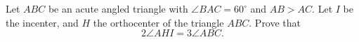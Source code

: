 Let $ABC$ be an acute angled triangle with $\angle{BAC}=60^\circ$ and $AB > AC$. Let $I$ be the incenter, and $H$ the orthocenter of the triangle $ABC$. Prove that \[2\angle{AHI}= 3\angle{ABC}.\]